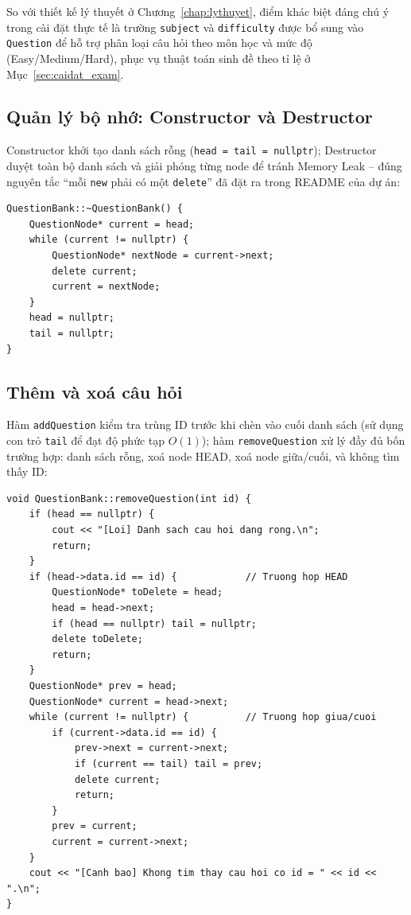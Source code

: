 \documentclass[11pt]{report}
\begin{document}
So với thiết kế lý thuyết ở Chương~\ref{chap:lythuyet}, điểm khác biệt đáng chú ý trong cài đặt thực tế là trường \texttt{subject} và \texttt{difficulty} được bổ sung vào \texttt{Question} để hỗ trợ phân loại câu hỏi theo môn học và mức độ (Easy/Medium/Hard), phục vụ thuật toán sinh đề theo tỉ lệ ở Mục~\ref{sec:caidat_exam}.

\subsection{Quản lý bộ nhớ: Constructor và Destructor}

Constructor khởi tạo danh sách rỗng (\texttt{head = tail = nullptr}); Destructor duyệt toàn bộ danh sách và giải phóng từng node để tránh Memory Leak -- đúng nguyên tắc ``mỗi \texttt{new} phải có một \texttt{delete}'' đã đặt ra trong README của dự án:

\begin{lstlisting}[caption={Destructor của QuestionBank (QuestionBank.cpp)}, label={lst:qb_dtor}]
QuestionBank::~QuestionBank() {
    QuestionNode* current = head;
    while (current != nullptr) {
        QuestionNode* nextNode = current->next;
        delete current;
        current = nextNode;
    }
    head = nullptr;
    tail = nullptr;
}
\end{lstlisting}

\subsection{Thêm và xoá câu hỏi}

Hàm \texttt{addQuestion} kiểm tra trùng ID trước khi chèn vào cuối danh sách (sử dụng con trỏ \texttt{tail} để đạt độ phức tạp $O(1)$); hàm \texttt{removeQuestion} xử lý đầy đủ bốn trường hợp: danh sách rỗng, xoá node HEAD, xoá node giữa/cuối, và không tìm thấy ID:

\begin{lstlisting}[caption={Xoá câu hỏi theo ID (QuestionBank.cpp)}, label={lst:qb_remove}]
void QuestionBank::removeQuestion(int id) {
    if (head == nullptr) {
        cout << "[Loi] Danh sach cau hoi dang rong.\n";
        return;
    }
    if (head->data.id == id) {            // Truong hop HEAD
        QuestionNode* toDelete = head;
        head = head->next;
        if (head == nullptr) tail = nullptr;
        delete toDelete;
        return;
    }
    QuestionNode* prev = head;
    QuestionNode* current = head->next;
    while (current != nullptr) {          // Truong hop giua/cuoi
        if (current->data.id == id) {
            prev->next = current->next;
            if (current == tail) tail = prev;
            delete current;
            return;
        }
        prev = current;
        current = current->next;
    }
    cout << "[Canh bao] Khong tim thay cau hoi co id = " << id << ".\n";
}
\end{lstlisting}
\end{document}
